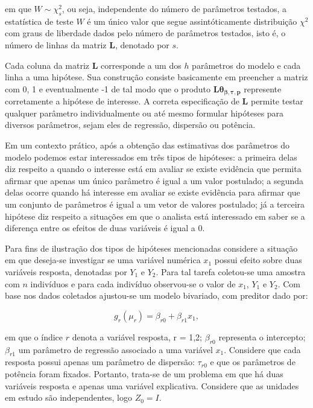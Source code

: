 \noindent em que $W \sim \chi^2_s$, ou seja, independente do número de parâmetros testados, a estatística de teste $W$ é um único valor que segue assintóticamente distribuição $\chi^2$ com graus de liberdade dados pelo número de parâmetros testados, isto é, o número de linhas da matriz $\boldsymbol{L}$, denotado por $s$. 

Cada coluna da matriz $\boldsymbol{L}$ corresponde a um dos $h$ parâmetros do modelo e cada linha a uma hipótese. Sua construção consiste basicamente em preencher a matriz com 0, 1 e eventualmente -1 de tal modo que o produto $\boldsymbol{L}\boldsymbol{\theta_{\beta,\tau,p}}$ represente corretamente a hipótese de interesse. A correta especificação de $\boldsymbol{L}$ permite testar qualquer parâmetro individualmente ou até mesmo formular hipóteses para diversos parâmetros, sejam eles de regressão, dispersão ou potência. 

Em um contexto prático, após a obtenção das estimativas dos parâmetros do modelo podemos estar interessados em três tipos de hipóteses: a primeira delas diz respeito a quando o interesse está em avaliar se existe evidência que permita afirmar que apenas um único parâmetro é igual a um valor postulado; a segunda delas ocorre quando há interesse em avaliar se existe evidência para afirmar que um conjunto de parâmetros é igual a um vetor de valores postulado; já a terceira hipótese diz respeito a situações em que o analista está interessado em saber se a diferença entre os efeitos de duas variáveis é igual a 0.

Para fins de ilustração dos tipos de hipóteses mencionadas considere a situação em que deseja-se investigar se uma variável numérica $x_1$ possui efeito sobre duas variáveis resposta, denotadas por $Y_1$ e $Y_2$. Para tal tarefa coletou-se uma amostra com $n$ indivíduos e para cada indivíduo observou-se o valor de $x_1$, $Y_1$ e $Y_2$. Com base nos dados coletados ajustou-se um modelo bivariado, com preditor dado por:

\begin{equation}
g_r(\mu_r) = \beta_{r0} + \beta_{r1} x_1,
\end{equation}

\noindent em que o índice $r$ denota a variável resposta, r = 1,2; $\beta_{r0}$ representa o intercepto; $\beta_{r1}$ um parâmetro de regressão associado a uma variável $x_1$. Considere que cada resposta possui apenas um parâmetro de dispersão: $\tau_{r0}$ e que os parâmetros de potência foram fixados. Portanto, trata-se de um problema em que há duas variáveis resposta e apenas uma variável explicativa. Considere que as unidades em estudo são independentes, logo $Z_0 = I$. 


